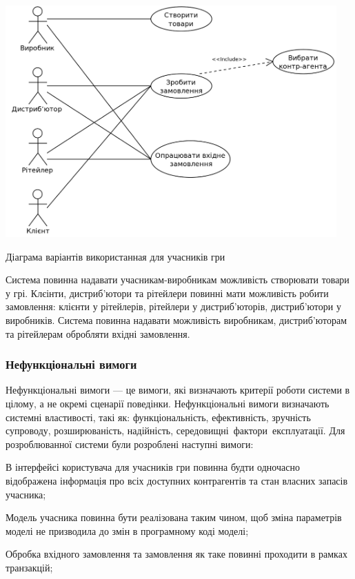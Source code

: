 \begin{longEnumerate}
            \begin{stdfigure}
                \includegraphics[width=5in]{images/uml_uc_players.png}
                \caption{Діаграма варіантів використанная для учасників гри}
                \label{fig:uml_uc_players}
            \end{stdfigure}

\item  Система повинна надавати учасникам-виробникам можливість створювати товари у грі. Клєінти, дистриб’ютори та рітейлери повинні мати можливість робити замовлення: клієнти у рітейлерів, рітейлери у дистриб’юторів, дистриб’ютори у виробників. Система повинна надавати можливість виробникам, дистриб’юторам та рітейлерам обробляти вхідні замовлення.
      \end{longEnumerate}
        \subsubsection{Нефункціональні вимоги}
Нефункціональні вимоги --- це вимоги, які визначають критерії роботи системи в цілому, а не окремі сценарії поведінки. Нефункціональні вимоги визначають системні властивості, такі як: функціональність, ефективність, зручність супроводу, розширюваність, надійність, середовищні фактори експлуатації. Для розроблюванної системи були розроблені наступні вимоги:
            \begin{longEnumerate}
\item В інтерфейсі користувача для учасників гри повинна будти одночасно відображена інформація про всіх доступних контрагентів та стан власних запасів учасника;
\item Модель учасника повинна бути реалізована таким чином, щоб зміна параметрів моделі не призводила до змін в програмному коді моделі; %
\item Обробка вхідного замовлення та замовлення як таке повинні проходити в рамках транзакцій;
            \end{longEnumerate}  
